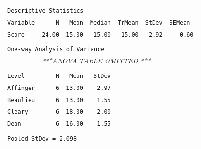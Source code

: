 \begin{table}[ht]


\begin{center}


\begin{tabular}{lrrrrrr}





\multicolumn{7}{l}{\texttt{Descriptive Statistics}}\\


\texttt{Variable} & \texttt{N} & \texttt{Mean} & \texttt{Median} & \texttt{TrMean} & \texttt{StDev} & \texttt{SEMean}\ \\ 





\texttt{Score} & \texttt{24.00} & \texttt{15.00} & \texttt{15.00} & \texttt{15.00} & \texttt{2.92} & \texttt{0.60} \\ 


\\


\multicolumn{7}{l}{\texttt{One-way Analysis of Variance}}\\


& \multicolumn{6}{l}{\textit{***ANOVA TABLE OMITTED ***}}


\\


\\





\texttt{Level} & \texttt{N} & \texttt{Mean} & \texttt{StDev} & & &\\ 





\texttt{Affinger} & \texttt{6} & \texttt{13.00} & \texttt{2.97} & & & \\ 


\texttt{Beaulieu} & \texttt{6} & \texttt{13.00} & \texttt{1.55} & & & \\ 


\texttt{Cleary} & \texttt{6} & \texttt{18.00} & \texttt{2.00} & & & \\ 


\texttt{Dean} & \texttt{6} & \texttt{16.00} & \texttt{1.55} & & & \\ 


\\


\multicolumn{7}{l}{\texttt{Pooled StDev = 2.098}}\\








\end{tabular}


\end{center}


\end{table}








